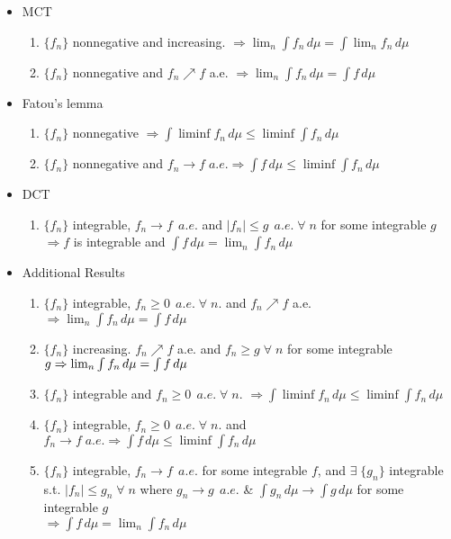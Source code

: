 \documentclass[12pt]{article}
\newcommand{\exist}{\exists \;}
\newcommand{\forany}{\; \forall \;}
\begin{document}
\begin{itemize}
\begin{itemize}
        \item MCT
        \begin{enumerate}
            \item $\{f_n\}$ nonnegative and increasing. $\Rightarrow \lim_n \int f_n \, d\mu=\int \lim_n f_n \, d\mu$
            \item $\{f_n\}$ nonnegative and $f_n\nearrow f$ a.e. $\Rightarrow \lim_n \int f_n \, d\mu=\int f \, d\mu$
            
        \end{enumerate}
        \item Fatou's lemma
        \begin{enumerate}
            \item $\{f_n\}$ nonnegative $\Rightarrow \int \liminf f_n \,d\mu\leq \liminf \int f_n \, d\mu$
            \item $\{f_n\}$ nonnegative and $f_n\rightarrow f\; a.e. \Rightarrow \int f \,d\mu\leq \liminf \int f_n \, d\mu$
            
        \end{enumerate}
        \item DCT
        \begin{enumerate}
            \item $\{f_n\}$ integrable, $f_n\rightarrow f \;\, a.e.$ and $|f_n|\leq g \;\, a.e.\forany n$ for some integrable $g$ \\$\Rightarrow f$ is integrable and $\int f \, d\mu= \lim_n \int f_n \, d\mu$
    
        \end{enumerate}
        \item Additional Results
        \begin{enumerate}
            \item $\{f_n\}$  integrable, $f_n\geq 0 \;\, a.e.\forany n$. and $f_n\nearrow f$ a.e. $\Rightarrow \lim_n \int f_n \, d\mu=\int f \, d\mu$
            \item $\{f_n\}$ increasing. $f_n\nearrow f$ a.e. and $f_n\geq g\forany n$ for some integrable $g\\ \Rightarrow \lim_n \int f_n \, d\mu=\int f \, d\mu$
            \item $\{f_n\}$  integrable and $f_n\geq 0 \;\, a.e.\forany n$. $\Rightarrow \int \liminf f_n \,d\mu\leq \liminf \int f_n \, d\mu$
            \item $\{f_n\}$  integrable, $f_n\geq 0 \;\, a.e.\forany n$. and $f_n\rightarrow f\; a.e. \Rightarrow \int f \,d\mu\leq \liminf \int f_n \, d\mu$
            \item $\{f_n\}$ integrable, $f_n\rightarrow f \;\, a.e.$ for some integrable $f$, and $\exist \{g_n\}$ integrable s.t. $|f_n|\leq g_n\forany n$ where $g_n\rightarrow g\;\, a.e.$ \& $\int g_n \, d\mu\rightarrow \int g\, d\mu$ for some integrable $g$ \\ $\Rightarrow \int f \, d\mu= \lim_n \int f_n \, d\mu$
            

\end{enumerate}
\end{itemize}
\end{itemize}
\end{document}
